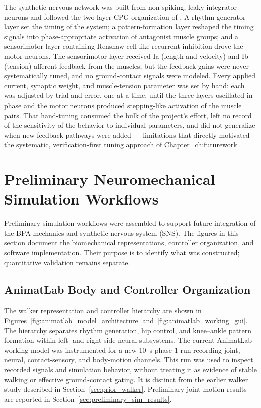 The synthetic nervous network was built from non-spiking, leaky-integrator neurons and followed the two-layer CPG organization of \citet{deng_neuromechanical_2019}. A rhythm-generator layer set the timing of the system; a pattern-formation layer reshaped the timing signals into phase-appropriate activation of antagonist muscle groups; and a sensorimotor layer containing Renshaw-cell-like recurrent inhibition drove the motor neurons. The sensorimotor layer received Ia (length and velocity) and Ib (tension) afferent feedback from the muscles, but the feedback gains were never systematically tuned, and no ground-contact signals were modeled. Every applied current, synaptic weight, and muscle-tension parameter was set by hand: each was adjusted by trial and error, one at a time, until the three layers oscillated in phase and the motor neurons produced stepping-like activation of the muscle pairs. That hand-tuning consumed the bulk of the project's effort, left no record of the sensitivity of the behavior to individual parameters, and did not generalize when new feedback pathways were added --- limitations that directly motivated the systematic, verification-first tuning approach of Chapter~\ref{ch:futurework}.

\section{Preliminary Neuromechanical Simulation Workflows}\label{sec:preliminary_sim_methods}

Preliminary simulation workflows were assembled to support future integration of the BPA mechanics and synthetic nervous system (SNS). The figures in this section document the biomechanical representations, controller organization, and software implementation. Their purpose is to identify what was constructed; quantitative validation remains separate.

\subsection{AnimatLab Body and Controller Organization}

The walker representation and controller hierarchy are shown in Figures~\ref{fig:animatlab_model_architecture} and~\ref{fig:animatlab_working_gui}. The hierarchy separates rhythm generation, hip control, and knee--ankle pattern formation within left- and right-side neural subsystems. The current AnimatLab working model was instrumented for a new \qty{10}{\second} phase-1 run recording joint, neural, contact-sensory, and body-motion channels. This run was used to inspect recorded signals and simulation behavior, without treating it as evidence of stable walking or effective ground-contact gating. It is distinct from the earlier walker study described in Section~\ref{sec:prior_walker}. Preliminary joint-motion results are reported in Section~\ref{sec:preliminary_sim_results}.

